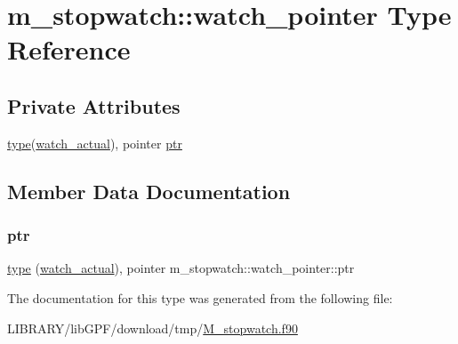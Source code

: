 \hypertarget{structm__stopwatch_1_1watch__pointer}{}\section{m\+\_\+stopwatch\+:\+:watch\+\_\+pointer Type Reference}
\label{structm__stopwatch_1_1watch__pointer}
\subsection*{Private Attributes}
\begin{DoxyCompactItemize}
\item 
\hyperlink{stop__watch_83_8txt_a70f0ead91c32e25323c03265aa302c1c}{type}(\hyperlink{structm__stopwatch_1_1watch__actual}{watch\+\_\+actual}), pointer \hyperlink{structm__stopwatch_1_1watch__pointer_aa8127bec6807a96f87e0bf41502c9290}{ptr}
\end{DoxyCompactItemize}


\subsection{Member Data Documentation}
\mbox{\label{structm__stopwatch_1_1watch__pointer_aa8127bec6807a96f87e0bf41502c9290}} 
\subsubsection{\texorpdfstring{ptr}{ptr}}
{\footnotesize\ttfamily \hyperlink{stop__watch_83_8txt_a70f0ead91c32e25323c03265aa302c1c}{type} (\hyperlink{structm__stopwatch_1_1watch__actual}{watch\+\_\+actual}), pointer m\+\_\+stopwatch\+::watch\+\_\+pointer\+::ptr\hspace{0.3cm}{\ttfamily [private]}}



The documentation for this type was generated from the following file\+:\begin{DoxyCompactItemize}
\item 
L\+I\+B\+R\+A\+R\+Y/lib\+G\+P\+F/download/tmp/\hyperlink{M__stopwatch_8f90}{M\+\_\+stopwatch.\+f90}\end{DoxyCompactItemize}
